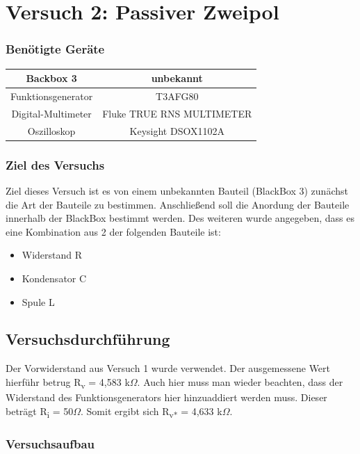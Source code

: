 \chapter{Versuch 2: Passiver Zweipol}
\subsection*{Benötigte Geräte}

\begin{tabular}[h]{c|c}
	Backbox 3 & unbekannt \\
    \hline
    Funktionsgenerator & T3AFG80\\
    \hline
    Digital-Multimeter & Fluke TRUE RNS MULTIMETER\\
    \hline
    Oszilloskop & Keysight DSOX1102A
    \label{tab:Versuch 2: Geräte}
\end{tabular}

\subsection{Ziel des Versuchs}
Ziel dieses Versuch ist es von einem unbekannten Bauteil (BlackBox 3) zunächst
die Art der Bauteile zu bestimmen. Anschließend soll die Anordung der Bauteile
innerhalb der BlackBox bestimmt werden. Des weiteren wurde angegeben, dass es eine
Kombination aus 2 der folgenden Bauteile ist:
\begin{itemize}
    \item Widerstand R
    \item Kondensator C
    \item Spule L
\end{itemize}

\section{Versuchsdurchführung}
Der Vorwiderstand aus Versuch 1 wurde verwendet. Der ausgemessene Wert hierführ
betrug R\textsubscript{v} = 4,583 k$\Omega$. Auch hier muss man wieder beachten, 
dass der Widerstand des Funktionsgenerators hier hinzuaddiert werden muss. 
Dieser beträgt R\textsubscript{i} = 50$\Omega$. Somit ergibt sich 
R\textsubscript{v*} = 4,633 k$\Omega$.

\subsection{Versuchsaufbau}

